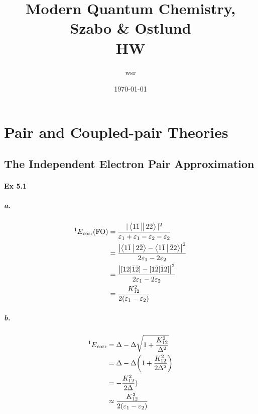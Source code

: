 \documentclass[a4paper]{article}
\title{\textbf{Modern Quantum Chemistry, Szabo \& Ostlund}\\HW}
\author{wsr
\vspace{5pt}\\
}
\date{\today} %
\DeclareMathOperator{\corr}{\mathrm{corr}}
\newcommand{\ex}[1]{\paragraph{Ex #1}}
\newcommand{\subex}[1]{\subparagraph{#1}}
\numberwithin{equation}{subsection}
\begin{document}

\maketitle

\tableofcontents

\newpage

\setcounter{section}{4}
\section{Pair and Coupled-pair Theories}
\subsection{The Independent Electron Pair Approximation}
\ex{5.1}
\subex{a.}
\begin{align}
{^1 E}_{\corr}(\text{FO}) &= \dfrac{|\Braket{1\bar{1}||2\bar{2}}|^2}{\varepsilon_1 + \varepsilon_1 - \varepsilon_2 - \varepsilon_2} \notag\\
&= \dfrac{\abs{\Braket{1\bar{1}|2\bar{2}} - \Braket{1\bar{1}|\bar{2} 2}}^2}{2\varepsilon_1 - 2\varepsilon_2} \notag\\
&= \dfrac{\abs{[12|\bar{1}\bar{2}] - [1\bar{2}|\bar{1} 2]}^2}{2\varepsilon_1 - 2\varepsilon_2} \notag\\
&= \dfrac{K_{12}^2}{2(\varepsilon_1 - \varepsilon_2)} 
\end{align}
\subex{b.}
\begin{align}
{^1 E}_{\corr} &= \Delta - \Delta\sqrt{1 + \dfrac{K_{12}^2}{\Delta^2}} \notag\\
&= \Delta - \Delta\qty(1 + \dfrac{K_{12}^2}{2\Delta^2}) \notag\\
&= - \dfrac{K_{12}^2}{2\Delta}) \notag\\
&\approx \dfrac{K_{12}^2}{2(\varepsilon_1 - \varepsilon_2)} 
\end{align}
\end{document}
